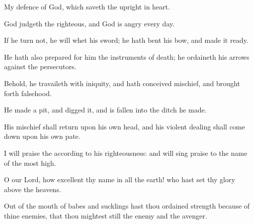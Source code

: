 {\Q {}My
defence
{} of
God, which
saveth the
upright in
heart.


\par }{\Q {}God
judgeth the
righteous, and
God is
angry
{} every
day.


\par }{\Q {}If he
turn not, he will
whet his
sword; he hath
bent his
bow, and made it
ready.


\par }{\Q {}He hath also
prepared for him the
instruments of
death; he
ordaineth his
arrows against the
persecutors.


\par }{\Q {}Behold, he
travaileth with
iniquity, and hath
conceived
mischief, and brought
forth
falsehood.


\par }{\Q {}He
made a
pit, and
digged it, and is
fallen into the
ditch
{} he
made.


\par }{\Q {}His
mischief shall
return upon his own
head, and his
violent dealing shall come
down upon his own
pate.


\par }{\Q {}I will
praise the
{} according to his
righteousness: and will sing
praise to the
name of the
{} most
high.




\par }
{\Q {}O
{} our
Lord, how
excellent
{} thy
name in all the
earth! who hast
set thy
glory above the
heavens.


\par }{\Q {}Out of the
mouth of
babes and
sucklings hast thou
ordained
strength because of thine
enemies, that thou mightest
still the
enemy and the
avenger.


\par }{\BB \par }
